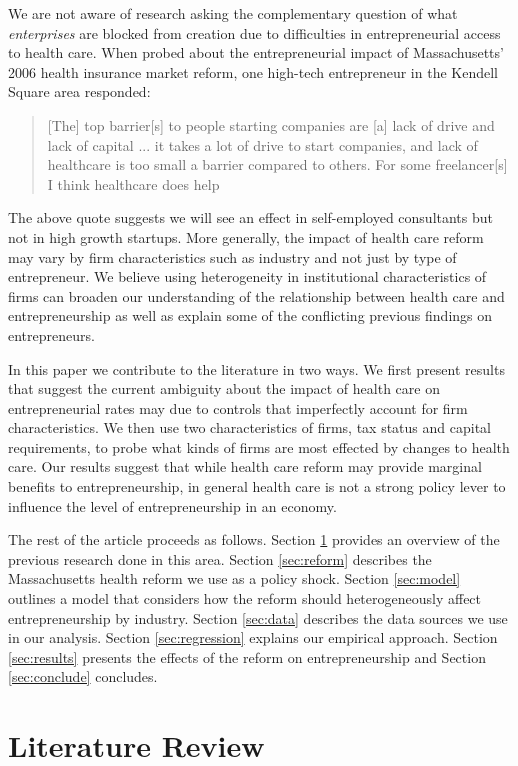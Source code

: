 \documentclass[12pt]{article}
\begin{document}
We are not aware of research asking the complementary question of what \emph{enterprises} are blocked from creation due to difficulties in entrepreneurial access to health care.  When probed about the entrepreneurial impact of Massachusetts' 2006 health insurance market reform, one high-tech entrepreneur in the Kendell Square area responded:
\begin{quote}
[The] top barrier[s] to people starting companies are [a] lack of drive and lack of capital ... it takes a lot of drive to start companies, and lack of healthcare is too small a barrier compared to others. For some freelancer[s] I think healthcare does help
\end{quote}
The above quote suggests we will see an effect in self-employed consultants but not in high growth startups. More generally, the impact of health care reform may vary by firm characteristics such as industry and not just by type of entrepreneur. We believe using heterogeneity in institutional characteristics of firms can broaden our understanding of the relationship between health care and entrepreneurship as well as explain some of the conflicting previous findings on entrepreneurs. 

In this paper we contribute to the literature in two ways. We first present results that suggest the current ambiguity about the impact of health care on entrepreneurial rates may due to controls that imperfectly account for firm characteristics. We then use two characteristics of firms, tax status and capital requirements, to probe what kinds of firms are most effected by changes to health care. Our results suggest that while health care reform may provide marginal benefits to entrepreneurship, in general health care is not a strong policy lever to influence the level of entrepreneurship in an economy.

The rest of the article proceeds as follows. Section \ref{sec:review} provides an overview of the previous research done in this area. Section \ref{sec:reform} describes the Massachusetts health reform we use as a policy shock. Section \ref{sec:model} outlines a model that considers how the reform should heterogeneously affect entrepreneurship by industry. Section \ref{sec:data} describes the data sources we use in our analysis. Section \ref{sec:regression} explains our empirical approach. Section \ref{sec:results} presents the effects of the reform on entrepreneurship and Section \ref{sec:conclude} concludes. 

\section{Literature Review}
\label{sec:review}
\end{document}

